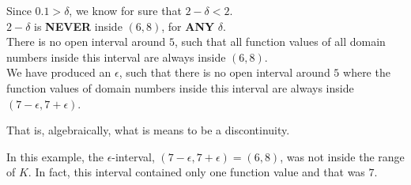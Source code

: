 \documentclass{ximera}
\begin{document}
\begin{example}
\begin{explanation}
\begin{image}
\end{image}



Since $0.1 > \delta$, we know for sure that $2 - \delta < 2$.  \\
$2 - \delta$ is \textbf{\textcolor{red!80!black}{NEVER}} inside $(6, 8)$, for \textbf{\textcolor{red!80!black}{ANY}} $\delta$.\\



There is no open interval around $5$, such that all function values of all domain numbers inside this interval are always inside $(6,8)$. \\




We have produced an $\epsilon$, such that there is no open interval around $5$ where the function values of domain numbers inside this interval are always inside $(7-\epsilon , 7+\epsilon)$.


That is, algebraically, what is means to be a discontinuity.



\end{explanation}
\end{example}


In this example, the $\epsilon$-interval, $(7-\epsilon, 7+\epsilon) = (6,8)$, was not inside the range of $K$.  In fact, this interval contained only one function value and that was $7$.
\end{document}
